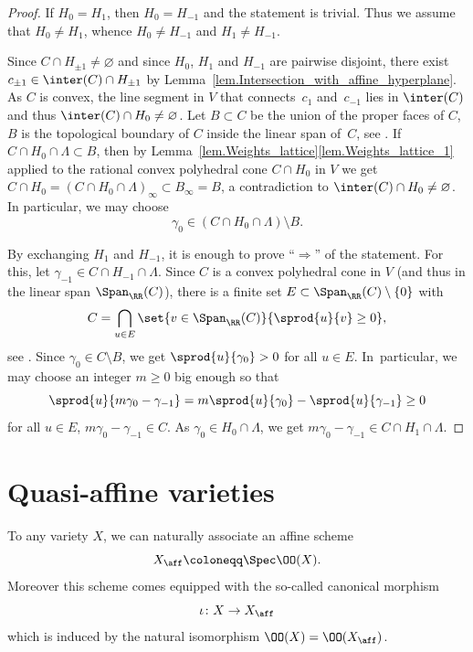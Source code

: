 \begin{proof}
If $H_0 = H_1$, then $H_0 = H_{-1}$ and the statement is trivial. Thus we assume that $H_0 \neq H_1$,
whence $H_0 \neq H_{-1}$ and $H_{1} \neq H_{-1}$.

Since $C \cap H_{\pm 1} \neq \varnothing$ and since $H_0$, $H_1$ and $H_{-1}$ are pairwise disjoint,
there exist $c_{\pm 1} \in \inter(C) \cap H_{\pm 1}$ by Lemma~\ref{lem.Intersection_with_affine_hyperplane}. As $C$ is convex, the line segment in
$V$ that connects~$c_1$ and~$c_{-1}$ lies in $\inter(C)$ and thus
$\inter(C) \cap H_0 \neq \varnothing$. Let
$B \subset C$ be the union of the proper faces of $C$, \ie $B$ is the topological
boundary of $C$ inside the linear span of~$C$, see \cite[Propty\,(7), p.\,10]{Fu1993Introduction-to-to}.
If $C \cap H_0 \cap \Lambda \subset B$, then by Lemma~\ref{lem.Weights_lattice}\eqref{lem.Weights_lattice_1} applied to
the rational convex polyhedral cone
$C \cap H_0$ in $V$ we get $C \cap H_0 = (C \cap H_0 \cap \Lambda)_{\infty} \subset B_{\infty} = B$,
a contradiction to $\inter(C) \cap H_0 \neq \varnothing$.
In particular, we may choose
\[
\gamma_0 \in (C \cap H_0 \cap \Lambda) \setminus B.
\]

By exchanging $H_1$ and $H_{-1}$, it is enough to prove
``$\Rightarrow$'' of the statement.
For this, let $\gamma_{-1} \in C \cap H_{-1} \cap \Lambda$.
Since $C$ is a convex polyhedral cone in $V$ (and thus in the linear span $\Span_{\RR}(C)$),
there is a finite set $E \subset \Span_{\RR}(C) \setminus \{0\}$ with
\[
C = \bigcap_{u \in E} \set{v \in \Span_{\RR}(C)}{\sprod{u}{v}\geq 0},
\]
see \cite[Propty\,(8), p. 11]{Fu1993Introduction-to-to}.
Since $\gamma_0 \in C \setminus B$, we get $\sprod{u}{\gamma_0} > 0$ for all $u \in E$. In~particular, we
may choose an integer $m \geq 0$ big enough so that
\[
\sprod{u}{m \gamma_0 - \gamma_{-1}} = m \sprod{u}{\gamma_0} - \sprod{u}{\gamma_{-1}} \geq 0
\]
for all $u \in E$, \ie $m \gamma_0 - \gamma_{-1} \in C$.
As $\gamma_0 \in H_0 \cap \Lambda$, we get
$m \gamma_0 - \gamma_{-1} \in C \cap H_1 \cap \Lambda$.
\end{proof}

\section{Quasi-affine varieties}
\label{sec.Quasi-affine}

To any variety $X$, we can naturally associate an affine scheme
\[
X_{\aff} \coloneqq \Spec \OO(X).
\]
Moreover this scheme comes equipped with the so-called canonical morphism
\[
\iota \colon X \to X_{\aff}
\]
which is induced by the natural isomorphism $\OO(X) = \OO(X_{\aff})$.

